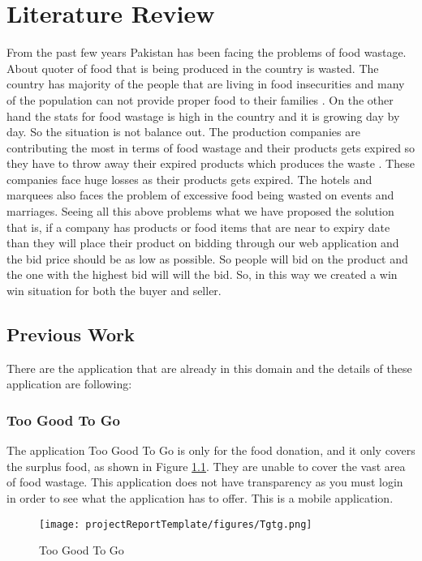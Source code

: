 \doublespacing
\chapter{Literature Review} \label{chap:literatureReview}



From the past few years Pakistan has been facing the problems of food wastage. About quoter of food that is being produced in the country is wasted. The country has majority of the people that are living in food insecurities and many of the population can not provide proper food to their families \cite{wenlock1980household}. On the other hand the stats for food wastage is high in the country and it is growing day by day. So the situation is not balance out. The production companies are contributing the most in terms of food wastage and their products gets expired so they have to throw away their expired products which produces the waste \cite{zhao2022exploring}. These companies face huge losses as their products gets expired. The hotels and marquees also faces the problem of excessive food being wasted on events and marriages. Seeing all this above problems what we have  proposed the solution that is, if a company has products or food items that are near to expiry date than they will place their product on bidding through our web application and the bid price should be as low as possible. So people will bid on the product and the one with the highest bid will will the bid. So, in this way we created a win win situation for both the buyer and seller.
\section{Previous Work}
There are the application that are already in this domain and the details of these application are following:
\subsection{Too Good To Go}
The application Too Good To Go \cite{ref5} is only for the food donation, and it only covers the surplus food, as shown in Figure \ref{fig1}. They are unable to cover the vast area of food wastage. This application does not have transparency as you must login in order to see what the application has to offer. This is a mobile application.\\
\begin{figure}[!h]
    \centering
    \texttt{[image: projectReportTemplate/figures/Tgtg.png]}
    \caption{Too Good To Go }
    \label{fig1}
\end{figure}

